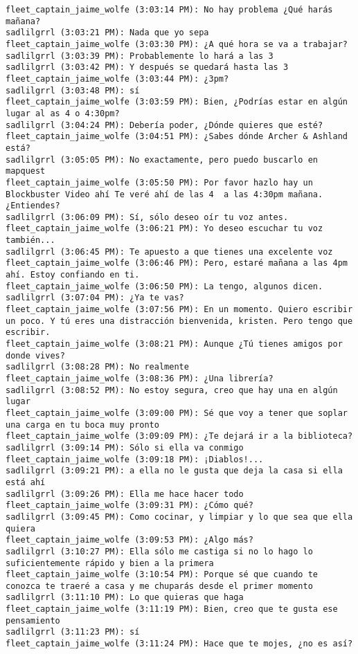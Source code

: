 \begin{verbatim}
fleet_captain_jaime_wolfe (3:03:14 PM): No hay problema ¿Qué harás mañana?
sadlilgrrl (3:03:21 PM): Nada que yo sepa
fleet_captain_jaime_wolfe (3:03:30 PM): ¿A qué hora se va a trabajar?
sadlilgrrl (3:03:39 PM): Probablemente lo hará a las 3
sadlilgrrl (3:03:42 PM): Y después se quedará hasta las 3
fleet_captain_jaime_wolfe (3:03:44 PM): ¿3pm?
sadlilgrrl (3:03:48 PM): sí
fleet_captain_jaime_wolfe (3:03:59 PM): Bien, ¿Podrías estar en algún lugar al as 4 o 4:30pm?
sadlilgrrl (3:04:24 PM): Debería poder, ¿Dónde quieres que esté?
fleet_captain_jaime_wolfe (3:04:51 PM): ¿Sabes dónde Archer & Ashland está?
sadlilgrrl (3:05:05 PM): No exactamente, pero puedo buscarlo en mapquest
fleet_captain_jaime_wolfe (3:05:50 PM): Por favor hazlo hay un Blockbuster Video ahí Te veré ahí de las 4  a las 4:30pm mañana. ¿Entiendes?
sadlilgrrl (3:06:09 PM): Sí, sólo deseo oír tu voz antes.
fleet_captain_jaime_wolfe (3:06:21 PM): Yo deseo escuchar tu voz también...
sadlilgrrl (3:06:45 PM): Te apuesto a que tienes una excelente voz
fleet_captain_jaime_wolfe (3:06:46 PM): Pero, estaré mañana a las 4pm ahí. Estoy confiando en ti.
fleet_captain_jaime_wolfe (3:06:50 PM): La tengo, algunos dicen.
sadlilgrrl (3:07:04 PM): ¿Ya te vas?
fleet_captain_jaime_wolfe (3:07:56 PM): En un momento. Quiero escribir un poco. Y tú eres una distracción bienvenida, kristen. Pero tengo que escribir.
fleet_captain_jaime_wolfe (3:08:21 PM): Aunque ¿Tú tienes amigos por donde vives?
sadlilgrrl (3:08:28 PM): No realmente
fleet_captain_jaime_wolfe (3:08:36 PM): ¿Una librería?
sadlilgrrl (3:08:52 PM): No estoy segura, creo que hay una en algún lugar
fleet_captain_jaime_wolfe (3:09:00 PM): Sé que voy a tener que soplar una carga en tu boca muy pronto
fleet_captain_jaime_wolfe (3:09:09 PM): ¿Te dejará ir a la biblioteca?
sadlilgrrl (3:09:14 PM): Sólo si ella va conmigo
fleet_captain_jaime_wolfe (3:09:18 PM): ¡Diablos!...
sadlilgrrl (3:09:21 PM): a ella no le gusta que deja la casa si ella está ahí
sadlilgrrl (3:09:26 PM): Ella me hace hacer todo
fleet_captain_jaime_wolfe (3:09:31 PM): ¿Cómo qué?
sadlilgrrl (3:09:45 PM): Como cocinar, y limpiar y lo que sea que ella quiera
fleet_captain_jaime_wolfe (3:09:53 PM): ¿Algo más?
sadlilgrrl (3:10:27 PM): Ella sólo me castiga si no lo hago lo suficientemente rápido y bien a la primera
fleet_captain_jaime_wolfe (3:10:54 PM): Porque sé que cuando te conozca te traeré a casa y me chuparás desde el primer momento
sadlilgrrl (3:11:10 PM): Lo que quieras que haga
fleet_captain_jaime_wolfe (3:11:19 PM): Bien, creo que te gusta ese pensamiento
sadlilgrrl (3:11:23 PM): sí
fleet_captain_jaime_wolfe (3:11:24 PM): Hace que te mojes, ¿no es así?

\end{verbatim}

